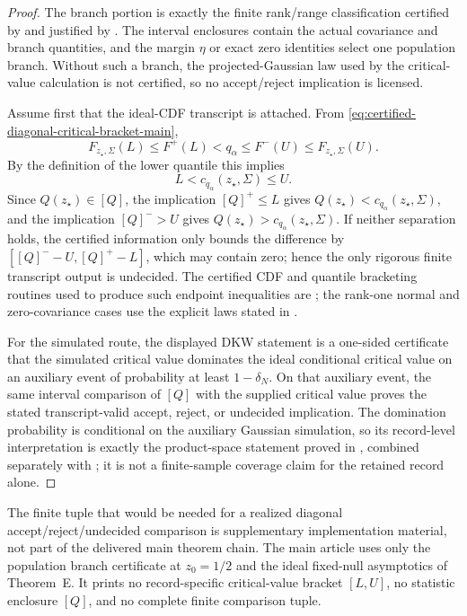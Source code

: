\begin{proof}
The branch portion is exactly the finite rank/range classification certified
by  and justified by
.
The interval enclosures contain the actual covariance and branch quantities,
and the margin \(\eta\) or exact zero identities select one population branch.
Without such a branch, the projected-Gaussian law used by the critical-value
calculation is not certified, so no accept/reject implication is licensed.

Assume first that the ideal-CDF transcript is attached.  From
\eqref{eq:certified-diagonal-critical-bracket-main},
\[
F_{z_\star,\Sigma}(L)\le F^+(L)<q_\alpha
\le F^-(U)\le F_{z_\star,\Sigma}(U).
\]
By the definition of the lower quantile this implies
\[
L<c_{q_\alpha}(z_\star,\Sigma)\le U.
\]
Since \(Q(z_\star)\in[Q]\), the implication
\([Q]^+\le L\) gives \(Q(z_\star)<c_{q_\alpha}(z_\star,\Sigma)\), and the implication
\([Q]^->U\) gives \(Q(z_\star)>c_{q_\alpha}(z_\star,\Sigma)\).  If neither separation
holds, the certified information only bounds the difference by
\([[Q]^--U,[Q]^+-L]\), which may contain zero; hence the only rigorous finite
transcript output is undecided.  The certified CDF and quantile bracketing routines used
to produce such endpoint inequalities are
;
the rank-one normal and zero-covariance cases use the explicit laws stated in
.

For the simulated route, the displayed DKW statement is a one-sided
certificate that the simulated critical value dominates the ideal conditional
critical value on an auxiliary event of probability at least
\(1-\delta_N\).  On that auxiliary event, the same interval comparison of
\([Q]\) with the supplied critical value proves the stated transcript-valid
accept, reject, or undecided implication.  The domination probability is conditional on the
auxiliary Gaussian simulation, so its record-level interpretation is exactly
the product-space statement proved in
, combined separately with
; it is not a finite-sample
coverage claim for the retained record alone.
\end{proof}
\else
\begin{remark}\label{thm:certified-diagonal-inference-main}\label{prop:projected-gaussian-certificate-interface-main}
The finite tuple that would be needed for a realized diagonal
accept/reject/undecided comparison is supplementary implementation material,
not part of the delivered main theorem chain.  The main article uses only the
population branch certificate at \(z_0=1/2\) and the ideal fixed-null
asymptotics of Theorem~E.  It prints no record-specific critical-value bracket
\([L,U]\), no statistic enclosure \([Q]\), and no complete finite comparison
tuple.
\end{remark}
\fi

